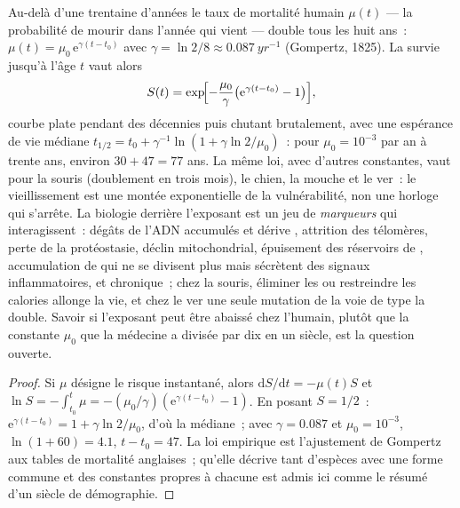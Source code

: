 \begin{proposition}\label{prop:b3:stem-cells:gompertz}
Au-delà d'une trentaine d'années le taux de mortalité humain $\mu(t)$
--- la probabilité de mourir dans l'année qui vient --- double tous les
huit ans~: $\mu(t) =
\mu_{0}\,\mathrm{e}^{\gamma(t - t_{0})}$ avec $\gamma = \ln 2/8 \approx
\qty{0.087}{yr^{-1}}$ (Gompertz, 1825). La survie jusqu'à l'âge $t$ vaut
alors
\[
S(t) = \exp\!\Bigl[-\frac{\mu_{0}}{\gamma}\bigl(\mathrm{e}^{\gamma(t - t_{0})} - 1\bigr)\Bigr],
\]
courbe plate pendant des décennies puis chutant brutalement, avec une
espérance de vie médiane
$t_{1/2} = t_{0} + \gamma^{-1}\ln(1 + \gamma\ln 2/\mu_{0})$~: pour
$\mu_{0} = 10^{-3}$ par an à trente ans, environ $30 + 47 = 77$ ans. La
même loi, avec d'autres constantes, vaut pour la souris (doublement en
trois mois), le chien, la mouche et le ver~: le vieillissement est une
montée exponentielle de la vulnérabilité, non une horloge qui s'arrête.
La biologie derrière l'exposant est un jeu de \emph{marqueurs} qui
interagissent~: dégâts de l'ADN accumulés et dérive ,
attrition des télomères, perte de la protéostasie, déclin
mitochondrial, épuisement des réservoirs de ,
accumulation de \emph{} qui ne se divisent plus mais
sécrètent des signaux inflammatoires, et  chronique~; chez
la souris, éliminer les  ou restreindre les calories
allonge la vie, et chez le ver une seule mutation de la voie de type
 la double. Savoir si l'exposant peut être abaissé chez l'humain,
plutôt que la constante $\mu_{0}$ que la médecine a divisée par dix en un
siècle, est la question ouverte.
\end{proposition}
\begin{proof}
Si $\mu$ désigne le risque instantané, alors
$\mathrm{d}S/\mathrm{d}t = -\mu(t)S$ et $\ln S =
-\int_{t_{0}}^{t}\mu = -(\mu_{0}/\gamma)(\mathrm{e}^{\gamma(t-t_{0})} -
1)$. En posant $S = 1/2$~: $\mathrm{e}^{\gamma(t-t_{0})} = 1 + \gamma\ln 2/
\mu_{0}$, d'où la médiane~; avec $\gamma = 0.087$ et $\mu_{0} =
10^{-3}$, $\ln(1 + 60) = 4.1$, $t - t_{0} = 47$. La loi empirique est
l'ajustement de Gompertz aux tables de mortalité anglaises~; qu'elle
décrive tant d'espèces avec une forme commune et des constantes propres
à chacune est admis ici comme le résumé d'un siècle de démographie.
\end{proof}

